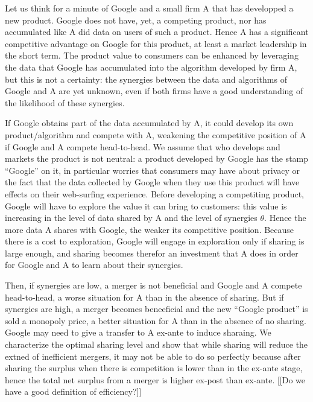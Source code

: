 \documentclass[a4paper,leqno]{article}%
\renewcommand{\t}{\theta}
\begin{document}
Let us think for a minute of Google and a small firm A that has developped a new product. Google does not have, yet, a competing product, nor has accumulated like A did data on users of such a product. Hence A has a significant competitive advantage on Google for this product, at least a market leadership in the short term. The product value to consumers can be enhanced by leveraging the data that Google has accumulated into the algorithm developed by firm A, but this is not a certainty: the synergies between the data and algorithms of Google and A are yet unknown, even if both firms have a good understanding of the likelihood of these synergies. 

If Google obtains part of the data accumulated by A, it could develop its own product/algorithm and compete with A, weakening the competitive position of A if Google and A compete head-to-head. We assume that who develops and markets the product is not neutral: a product developed by Google has the stamp ``Google'' on it, in particular worries that consumers may have about privacy or the fact that the data collected by Google when they use this product will have effects on their web-surfing experience. Before developing a competiting product, Google will have to explore the value it can bring to customers: this value is increasing in the level of data shared by A and the level of synergies $\t$. Hence the more data A shares with Google, the weaker its competitive position. Because there is a cost to exploration, Google will engage in exploration only if sharing is large enough, and sharing becomes therefor an investment that A does in order for Google and A to learn about their synergies.

Then, if synergies are low, a merger is not beneficial and Google and A compete head-to-head, a worse situation for A than in the absence of sharing. But if synergies are high, a merger becomes beneeficial and the new ``Google product'' is sold a monopoly price, a better situation for A than in the absence of no sharing. Google may need to give a transfer to A ex-ante to induce sharaing. We characterize the optimal sharing level and show that while sharing will reduce the extned of inefficient mergers, it may not be able to do so perfectly because after sharing the surplus when there is competition is lower than in the ex-ante stage, hence the total net surplus from a merger is higher ex-post than ex-ante. [[Do we have a good definition of efficiency?]]
\end{document}
